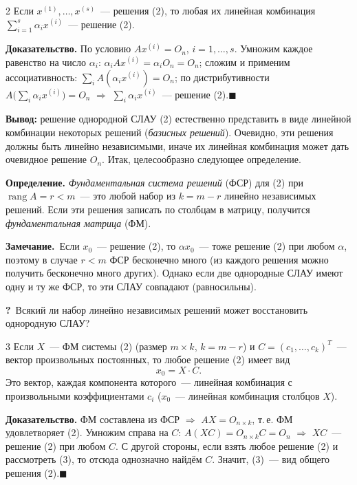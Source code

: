 \documentclass[a4paper,11pt]{article}
\newcommand{\q}{\textbf{\color{red!70!black}?}\ }
\newcommand{\zam}{\textbf{Замечание.}\ }
\newcommand{\qedr}{\hfill$\blacksquare$}
\newcommand{\rang}{\operatorname{rang}}
\begin{document}
\begin{teor}{2}
Если $x^{(1)},\dots,x^{(s)}$~--- решения (2), то любая их линейная комбинация
$\sum\limits_{i=1}^{s}\alpha_ix^{(i)}$~--- решение (2).
\end{teor}

\textbf{Доказательство.} По условию $Ax^{(i)}=O_n$, $i=1,\dots,s$. Умножим каждое равенство на число
$\alpha_i$: $\alpha_iAx^{(i)}=\alpha_iO_n=O_n$; сложим и применим ассоциативность:
$\sum_iA(\alpha_ix^{(i)})=O_n$; по дистрибутивности $A\bigl(\sum_i\alpha_ix^{(i)}\bigr)=O_n$
$\Rightarrow$ $\sum_i\alpha_ix^{(i)}$~--- решение (2).\qedr

\textbf{Вывод:} решение однородной СЛАУ (2) естественно представить в виде линейной комбинации
некоторых решений (\emph{базисных решений}). Очевидно, эти решения должны быть линейно
независимыми, иначе их линейная комбинация может дать очевидное решение $O_n$. Итак, целесообразно
следующее определение.

\begin{opr}
\textbf{Определение.} \emph{Фундаментальная система решений} (ФСР) для (2) при $\rang A=r<m$~---
это любой набор из $k=m-r$ линейно независимых решений. Если эти решения записать по столбцам
в матрицу, получится \emph{фундаментальная матрица} (ФМ).
\end{opr}

\zam Если $x_0$~--- решение (2), то $\alpha x_0$~--- тоже решение (2) при любом $\alpha$, поэтому в
случае $r<m$ ФСР бесконечно много (из каждого решения можно получить бесконечно много других).
Однако если две однородные СЛАУ имеют одну и ту же ФСР, то эти СЛАУ совпадают (равносильны).

\q Всякий ли набор линейно независимых решений может восстановить однородную СЛАУ?

\begin{teor}{3}
Если $X$~--- ФМ системы (2) (размер $m\times k$, $k=m-r$) и $C=(c_1,\dots,c_k)^T$~--- вектор
произвольных постоянных, то любое решение (2) имеет вид
\[
x_0=X\cdot C.\tag{3}
\]
Это вектор, каждая компонента которого~--- линейная комбинация с произвольными коэффициентами
$c_i$ ($x_0$~--- линейная комбинация столбцов $X$).
\end{teor}

\textbf{Доказательство.} ФМ составлена из ФСР $\Rightarrow$ $AX=O_{n\times k}$, т.\,е. ФМ
удовлетворяет (2). Умножим справа на $C$: $A(XC)=O_{n\times k}C=O_n$ $\Rightarrow$ $XC$~--- решение (2)
при любом $C$. С другой стороны, если взять любое решение (2) и рассмотреть (3), то отсюда
однозначно найдём $C$. Значит, (3)~--- вид общего решения (2).\qedr
\end{document}
